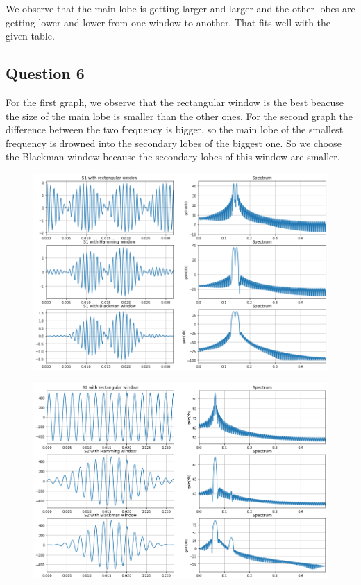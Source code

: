 \documentclass[]{article}
\begin{document}
We observe that the main lobe is getting larger and larger and the other lobes are getting lower and lower from one window to another.
That fits well with the given table.

\subsection*{Question 6}


For the first graph, we observe that the rectangular window is the best beacuse the size of the main lobe is smaller than the other ones. For the second graph the
difference between the two frequency is bigger, so the main lobe of the smallest frequency is drowned into the secondary lobes of the biggest one. So we choose
the Blackman window because the secondary lobes of this window are smaller.

\begin{figure}[H]
    \centering
\includegraphics[scale=0.5]{q61.png}
\end{figure}

\begin{figure}[H]
    \centering
\includegraphics[scale=0.5]{q62.png}
\end{figure}
\end{document}
